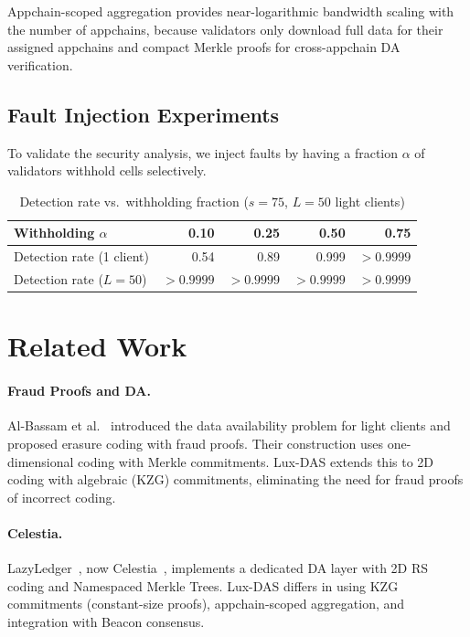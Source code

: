 \documentclass[11pt,a4paper]{article}
\theoremstyle{plain}
\theoremstyle{definition}
\theoremstyle{remark}
\begin{document}
Appchain-scoped aggregation provides near-logarithmic bandwidth scaling with the number of
appchains, because validators only download full data for their assigned appchains and compact
Merkle proofs for cross-appchain DA verification.

\subsection{Fault Injection Experiments}

To validate the security analysis, we inject faults by having a fraction $\alpha$ of
validators withhold cells selectively.

\begin{table}[H]
\centering
\caption{Detection rate vs.\ withholding fraction ($s = 75$, $L = 50$ light clients)}
\label{tab:fault-injection}
\begin{tabular}{lrrrr}
\toprule
\textbf{Withholding $\alpha$} & 0.10 & 0.25 & 0.50 & 0.75 \\
\midrule
Detection rate (1 client) & 0.54 & 0.89 & 0.999 & $>0.9999$ \\
Detection rate ($L=50$) & $>0.9999$ & $>0.9999$ & $>0.9999$ & $>0.9999$ \\
\bottomrule
\end{tabular}
\end{table}


\section{Related Work}
\label{sec:related}

\paragraph{Fraud Proofs and DA.}
Al-Bassam et al.~\cite{albassam2018fraud} introduced the data availability problem for
light clients and proposed erasure coding with fraud proofs. Their construction uses
one-dimensional coding with Merkle commitments. Lux-DAS extends this to 2D coding with
algebraic (KZG) commitments, eliminating the need for fraud proofs of incorrect coding.

\paragraph{Celestia.}
LazyLedger~\cite{albassam2019lazyledger}, now Celestia~\cite{celestia2023}, implements
a dedicated DA layer with 2D RS coding and Namespaced Merkle Trees. Lux-DAS differs in
using KZG commitments (constant-size proofs), appchain-scoped aggregation, and integration
with Beacon consensus.
\end{document}
